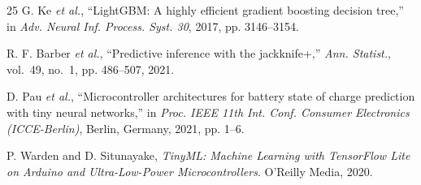 \documentclass[conference,a4paper]{IEEEtran}
\begin{document}
\begin{thebibliography}{25}
 G. Ke \emph{et al.}, ``LightGBM: A highly efficient gradient
boosting decision tree,'' in \emph{Adv. Neural Inf. Process. Syst. 30},
2017, pp. 3146--3154.

 R. F. Barber \emph{et al.}, ``Predictive inference with the jackknife+,''
\emph{Ann. Statist.}, vol.~49, no.~1, pp. 486--507, 2021.

 D. Pau \emph{et al.},
``Microcontroller architectures for battery state of charge prediction with
tiny neural networks,'' in \emph{Proc. IEEE 11th Int. Conf. Consumer
Electronics (ICCE-Berlin)}, Berlin, Germany, 2021, pp. 1--6.

 P. Warden and D. Situnayake, \emph{TinyML: Machine
Learning with TensorFlow Lite on Arduino and Ultra-Low-Power
Microcontrollers}. O'Reilly Media, 2020.

\end{thebibliography}
\end{document}
